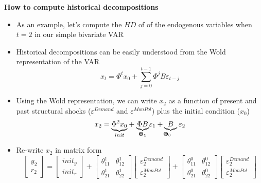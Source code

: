 \begin{frame}
{\textbf{How to compute historical decompositions }}

\begin{itemize}
\item As an example, let's compute the $HD$ of of the endogenous variables
when $t=2$ in our simple bivariate VAR\bigskip

\item Historical decompositions can be easily understood from the Wold
representation of the VAR%
\begin{equation*}
x_{t}={\Phi ^{t}x_{0}}+{\sum\limits_{j=0}^{t-1}\Phi ^{j}B\varepsilon _{t-j}}
\end{equation*}%
\vspace{-.1cm}\pause

\item Using the Wold representation, we can write $x_{2}$ as a function of
present and past structural shocks ($\varepsilon ^{Demand}$ and $\varepsilon
^{MonPol}$) plus the initial condition ($x_{0}$)%
\begin{equation*}
x_{2}=\underset{init}{\underbrace{\Phi ^{2}x_{0}}}+\underset{\boldsymbol{%
\Theta }_{\boldsymbol{1}}}{\underbrace{\Phi B}}\varepsilon _{1}\underset{%
\boldsymbol{\Theta }_{0}}{+\underbrace{B}}\varepsilon _{2}
\end{equation*}%
\vspace{-.1cm}\pause

\item Re-write $x_{2}$ in matrix form 
\begin{equation*}
\begin{bmatrix}
y_{2} \\ 
r_{2}%
\end{bmatrix}%
=%
\begin{bmatrix}
init_{y} \\ 
init_{r}%
\end{bmatrix}%
+%
\begin{bmatrix}
\theta _{11}^{1} & \theta _{12}^{1} \\ 
\theta _{21}^{1} & \theta _{22}^{1}%
\end{bmatrix}%
\begin{bmatrix}
\varepsilon _{2}^{Demand} \\ 
\varepsilon _{2}^{MonPol}%
\end{bmatrix}%
+%
\begin{bmatrix}
\theta _{11}^{0} & \theta _{12}^{0} \\ 
\theta _{21}^{0} & \theta _{22}^{0}%
\end{bmatrix}%
\begin{bmatrix}
\varepsilon _{2}^{Demand} \\ 
\varepsilon _{2}^{MonPol}%
\end{bmatrix}%
\end{equation*}
\end{itemize}
\end{frame}

